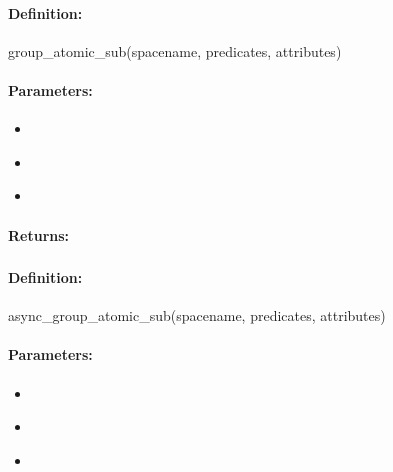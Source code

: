 \paragraph{Definition:}
\begin{rubycode}
group_atomic_sub(spacename, predicates, attributes)
\end{rubycode}

\paragraph{Parameters:}
\begin{itemize}[noitemsep]
\item {}\\

\item {}\\

\item {}\\

\end{itemize}

\paragraph{Returns:}


\pagebreak
\subsubsection{}
\label{api:ruby:async_group_atomic_sub}


\paragraph{Definition:}
\begin{rubycode}
async_group_atomic_sub(spacename, predicates, attributes)
\end{rubycode}

\paragraph{Parameters:}
\begin{itemize}[noitemsep]
\item {}\\

\item {}\\

\item {}\\

\end{itemize}


